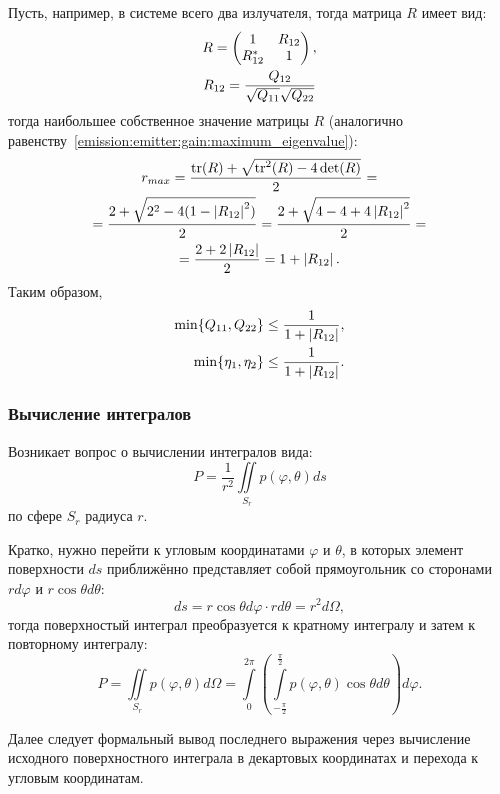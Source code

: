 Пусть, например, в системе всего два излучателя, тогда матрица $R$ имеет вид:
\begin{gather}
    R
    = \begin{pmatrix}
        1        & R_{12} \\
        R_{12}^* & 1
    \end{pmatrix}
    \notag, \\
    R_{12} = \frac{Q_{12}}{\sqrt{Q_{11}} \sqrt{Q_{22}}}
    \label{emission:emitter:efficiency:diagram_intersection}
\end{gather}
тогда наибольшее собственное значение матрицы $R$ (аналогично равенству~\eqref{emission:emitter:gain:maximum_eigenvalue}):
\begin{multline*}
    r_{max}
    = \frac{\operatorname{tr}(R) + \sqrt{\operatorname{tr}^2(R) - 4 \det(R)}}{2} = \\
    = \frac{2 + \sqrt{2^2 - 4 (1 - \left | R_{12} \right |^2)}}{2}
    = \frac{2 + \sqrt{4 - 4 + 4 \left | R_{12} \right |^2}}{2} = \\
    = \frac{2 + 2 \left | R_{12} \right |}{2}
    = 1 + \left | R_{12} \right | .
\end{multline*}
Таким образом,
\begin{align*}
    \min \{ Q_{11}, Q_{22} \} & \le \frac{1}{1 + \left | R_{12} \right |} , \\
    \min \{ \eta_1, \eta_2 \} & \le \frac{1}{1 + \left | R_{12} \right |} .
\end{align*}

\subsubsection{Вычисление интегралов}

Возникает вопрос о вычислении интегралов вида:
\[
    P = \frac{1}{r^2} \iint \limits_{S_r} p(\varphi, \theta) ds
\]
по сфере $S_r$ радиуса $r$.

Кратко, нужно перейти к угловым координатами $\varphi$ и $\theta$, в которых элемент поверхности $ds$ приближённо представляет собой прямоугольник
со сторонами $r d\varphi$ и $r \cos \theta d\theta$:
\[
    ds = r \cos \theta d\varphi \cdot r d\theta = r^2 d\Omega,
\]
тогда поверхностый интеграл преобразуется к кратному интегралу и затем к повторному интегралу:
\[
    P
    = \iint \limits_{S_r} p(\varphi, \theta) d\Omega
    = \int \limits_0^{2 \pi} \left( \int \limits_{-\frac{\pi}{2}}^{\frac{\pi}{2}} p(\varphi, \theta) \cos \theta d\theta \right) d\varphi .
\]

Далее следует формальный вывод последнего выражения через вычисление исходного поверхностного интеграла в декартовых координатах и перехода к угловым координатам.

